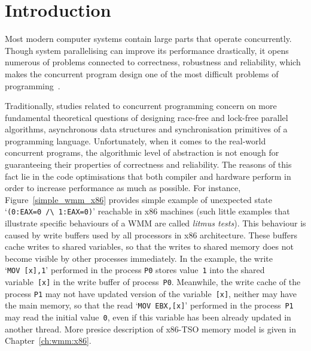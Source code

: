 \chapter{Introduction}
\label{ch:introduction}

Most modern computer systems contain large parts that operate concurrently. Though system parallelising can improve its performance drastically, it opens numerous of problems connected to correctness, robustness and reliability, which makes the concurrent program design one of the most difficult problems of programming~\cite{mckenney2017parallel}.

Traditionally, studies related to concurrent programming concern on more fundamental theoretical questions of designing race-free and lock-free parallel algorithms, asynchronous data structures and synchronisation primitives of a programming language. Unfortunately,
when it comes to 
the real-world concurrent programs, the algorithmic level of abstraction is not enough for guaranteeing their properties of correctness and reliability. The reasons of this fact lie in the code optimisations that both compiler and hardware perform in order to increase performance as much as possible. For instance, Figure~\ref{simple_wmm_x86} provides simple example of
unexpected state `\texttt{(0:EAX=0~/\textbackslash~1:EAX=0)}' reachable in x86 machines (such little examples that illustrate specific behaviours of a WMM are called \textit{litmus tests}).
This behaviour is caused by write buffers used by all processors in x86 architecture. These buffers cache writes to shared variables, so that the writes to shared memory does not become visible by other processes immediately. In the example, the write `\texttt{MOV~[x],1}' performed in the process \texttt{P0} stores value~\texttt{1} into the shared variable~\texttt{[x]} in the write buffer of process~\texttt{P0}. Meanwhile, the write cache of the process \texttt{P1} may not have updated version of the variable~\texttt{[x]}, neither may have the main memory, so that the read `\texttt{MOV~EBX,[x]}' performed in the process~\texttt{P1} may read the initial value~\texttt{0}, even if this variable has been already updated in another thread. More presice description of x86-TSO memory model is given in Chapter~\ref{ch:wmm:x86}.

